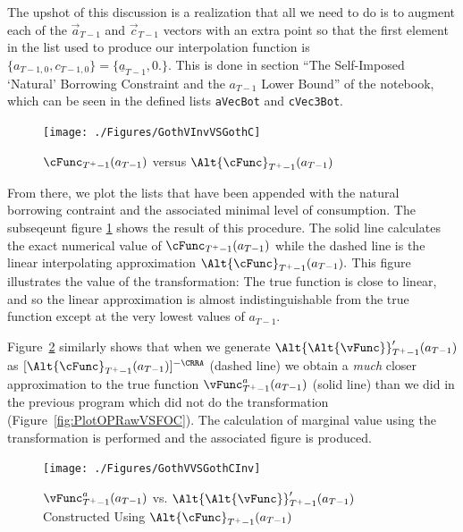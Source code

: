 \documentclass[titlepage, headings=optiontotocandhead]{\econtex}
\begin{document}
The upshot of this discussion is a realization that all we need to do is to
augment each of the $\vec{a}_{T-1}$ and $\vec{c}_{T-1}$ vectors with an extra point so that the
first element in the list used to produce our interpolation function is
$\{{a}_{T-1,0},{c}_{T-1,0}\}=\{\underline{a}_{T-1},0.\}$. This is done in section
``The Self-Imposed `Natural' Borrowing Constraint and the $a_{T-1}$ Lower Bound'' of the notebook,
which can be seen in the defined lists
\texttt{aVecBot} and \texttt{cVec3Bot}.

\hypertarget{GothVInvVSGothC}{}
\begin{figure}
  \centerline{\texttt{[image: ./Figures/GothVInvVSGothC]}}
  \caption{$\cFunc_{T^{+}-1}({a}_{T-1})$ versus $\Alt{\cFunc}_{T^{+}-1}({a}_{T-1})$}
  \label{fig:GothVInvVSGothC}
\end{figure}


From there, we plot the lists that have been appended with the natural borrowing contraint and the associated minimal level of consumption. The subseqeunt figure \ref{fig:GothVInvVSGothC} shows the result of this procedure. The solid line calculates the exact numerical value of $\cFunc_{T^{+}-1}({a}_{T-1})$ while the dashed line is the linear interpolating approximation $\Alt{\cFunc}_{T^{+}-1}({a}_{T-1}).$ This figure illustrates the value of the transformation: The true function is close to linear, and so the linear approximation is almost indistinguishable from the true function except at the very lowest values of ${a}_{T-1}$.

Figure~\ref{fig:GothVVSGothCInv} similarly shows that when we generate
$\Alt{\Alt{\vFunc}}_{T^{+}-1}^{\prime}({a}_{T-1})$ as
$[\Alt{\cFunc}_{T^{+}-1}({a}_{T-1})]^{-\CRRA}$ (dashed line) we
obtain a \textit{much} closer approximation to the true function
$\vFunc^{{a}}_{T^{+}-1}({a}_{T-1})$ (solid line) than we did in
the previous program which did not do the
transformation (Figure~\ref{fig:PlotOPRawVSFOC}). The calculation of marginal value using the transformation is performed and the
associated figure is produced.

\hypertarget{GothVVSGothCInv}{}
\begin{figure}
  \centerline{\texttt{[image: ./Figures/GothVVSGothCInv]}}
  \caption{$\vFunc^{{a}}_{T^{+}-1}({a}_{T-1})$ vs. $\Alt{\Alt{\vFunc}}_{T^{+}-1}^{\prime}({a}_{T-1})$ Constructed Using $\Alt{\cFunc}_{T^{+}-1}({a}_{T-1})$}
  \label{fig:GothVVSGothCInv}
\end{figure}
\end{document}
